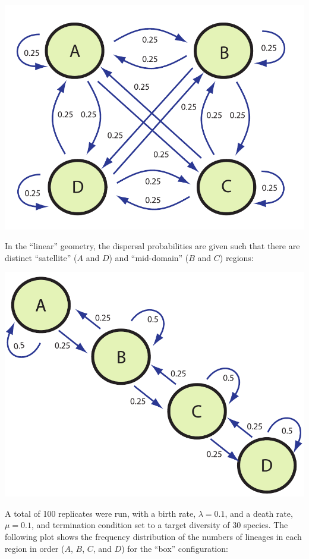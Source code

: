 \documentclass[11pt]{article}
\begin{document}
\begin{center}
	\includegraphics[scale=0.3]{box-model.pdf}
\end{center}

In the ``linear'' geometry, the dispersal probabilities are given such that there are distinct ``satellite'' ($A$ and $D$) and ``mid-domain'' ($B$ and $C$) regions:

\begin{center}
	\includegraphics[scale=0.3]{linear-model.pdf}
\end{center}

A total of 100 replicates were run, with a birth rate, $\lambda=0.1$, and a death rate, $\mu=0.1$, and termination condition set to a target diversity of 30 species.
The following plot shows the frequency distribution of the numbers of lineages in each region in order ($A$, $B$, $C$, and $D$) for the ``box'' configuration:
\end{document}
